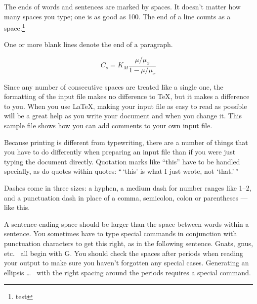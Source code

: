 \documentclass[book, 12pt]{phd}
\begin{document}
\makeatletter
\two@digits{\@arabic\c@section}
\makeatother

The ends  of words and sentences are marked
  by   spaces. It  doesn't matter how many
spaces    you type; one is as good as 100.  The
end of   a line counts as a space.\footnote{test}

One   or more   blank lines denote the  end
of  a paragraph.

\begin{equation}
    C_{s}  =  K_{M} \frac{\mu/\mu_{x}}{1-\mu/\mu_{x}} \label{cs}
\end{equation}


Since any number of consecutive spaces are treated like a single
one, the formatting of the input file makes no difference to
      \TeX,         %
but it makes a difference to you.
When you use
      \LaTeX,       %
making your input file as easy to read as possible
will be a great help as you write your document and when you
change it.  This sample file shows how you can add comments to
your own input file.

Because printing is different from typewriting, there are a
number of things that you have to do differently when preparing
an input file than if you were just typing the document directly.
Quotation marks like
       ``this''
have to be handled specially, as do quotes within quotes:
       ``\,`this'                  %
    is what I just
    wrote, not  `that.'\,''

Dashes come in three sizes: a hyphen, %
a medium dash for number ranges like
       1--2,
and a punctuation dash in place of a comma, semicolon, colon or parentheses
       ---like
this.

A sentence-ending space should be larger than the space between words
within a sentence.  You sometimes have to type special commands in
conjunction with punctuation characters to get this right, as in the
following sentence.
       Gnats, gnus, etc.\    %
       all begin with G\@.   %
You should check the spaces after periods when reading your output to
make sure you haven't forgotten any special cases.
Generating an ellipsis
       \ldots\    %
with the right spacing around the periods
requires a special  command.
\end{document}
